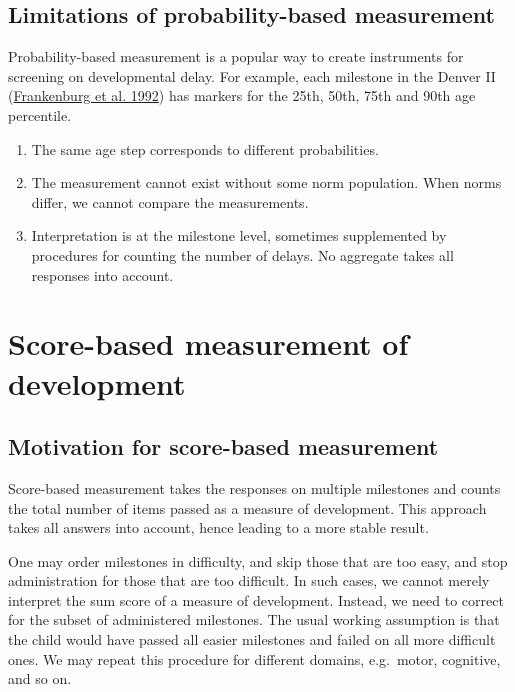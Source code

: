 \documentclass[
]{book}
\providecommand{\tightlist}{%
  \setlength{\itemsep}{0pt}\setlength{\parskip}{0pt}}
\begin{document}
\hypertarget{limitations-of-probability-based-measurement}{%
\subsection{Limitations of probability-based measurement}\label{limitations-of-probability-based-measurement}}

Probability-based measurement is a popular way to create instruments for screening on developmental delay. For example, each milestone in the Denver II (\protect\hyperlink{ref-frankenburg1992}{Frankenburg et al. 1992}) has markers for the 25th, 50th, 75th and 90th age percentile.

\begin{enumerate}
\def\labelenumi{\arabic{enumi}.}
\tightlist
\item
  The same age step corresponds to different probabilities.
\item
  The measurement cannot exist without some norm population. When norms differ, we cannot compare the measurements.
\item
  Interpretation is at the milestone level, sometimes supplemented by procedures for counting the number of delays. No aggregate takes all responses into account.
\end{enumerate}

\hypertarget{sec:scorebased}{%
\section{Score-based measurement of development}\label{sec:scorebased}}

\hypertarget{sec:motivscorebased}{%
\subsection{Motivation for score-based measurement}\label{sec:motivscorebased}}

Score-based measurement takes the responses on multiple milestones and counts the total number of items passed as a measure of development. This approach takes all answers into account, hence leading to a more stable result.

One may order milestones in difficulty, and skip those that are too easy, and stop administration for those that are too difficult. In such cases, we cannot merely interpret the sum score of a measure of development. Instead, we need to correct for the subset of administered milestones. The usual working assumption is that the child would have passed all easier milestones and failed on all more difficult ones. We may repeat this procedure for different domains, e.g.~motor, cognitive, and so on.
\end{document}
